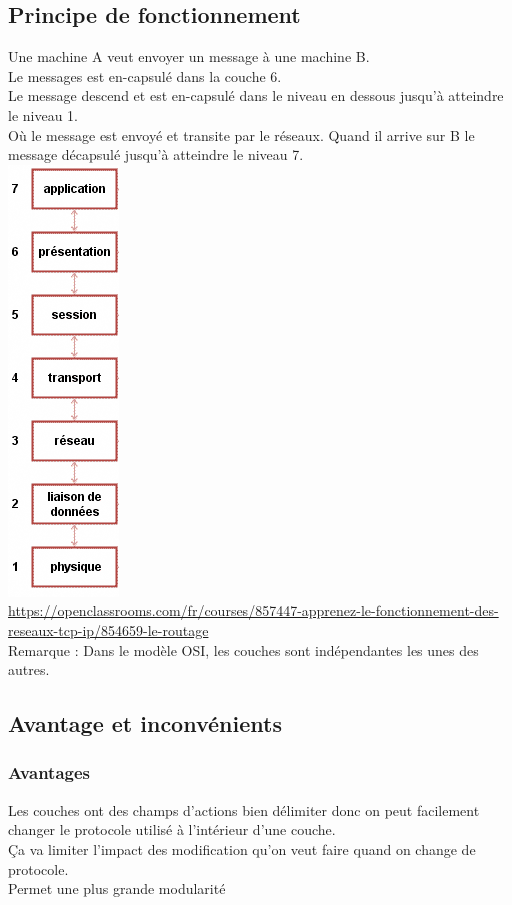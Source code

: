 \documentclass{article}
\begin{document}
\subsection{Principe de fonctionnement}
Une machine A veut envoyer un message à une machine B. \\
Le messages est en-capsulé dans la couche 6. \\
Le message descend et est en-capsulé dans le niveau en dessous jusqu’à atteindre le niveau 1. \\
Où le message est envoyé et transite par le réseaux. Quand il arrive sur B le message décapsulé jusqu’à atteindre le niveau 7. \\  
\includegraphics{modele_OSI.png} \\ 
\url{https://openclassrooms.com/fr/courses/857447-apprenez-le-fonctionnement-des-reseaux-tcp-ip/854659-le-routage}
\\
Remarque : Dans le modèle OSI, les couches sont indépendantes les unes des autres.
\subsection{Avantage et inconvénients}
\subsubsection*{Avantages}
Les couches ont des champs d’actions bien délimiter donc on peut facilement changer le protocole utilisé à l’intérieur d’une couche. \\
Ça va limiter l’impact des modification qu’on veut faire quand on change de protocole. \\
Permet une plus grande modularité \\
\end{document}
